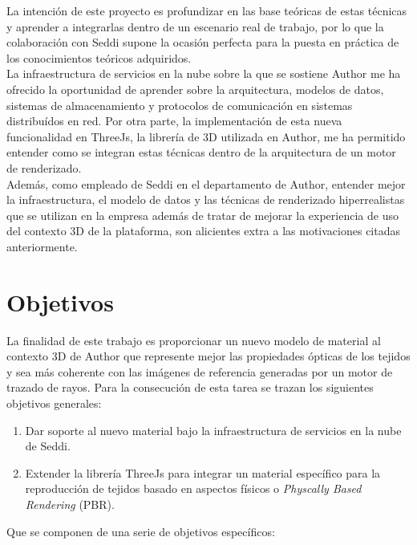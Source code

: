 La intenci\'on de este proyecto es profundizar en las base te\'oricas de estas t\'ecnicas y aprender a integrarlas
dentro de un escenario real de trabajo, por lo que la colaboraci\'on con Seddi supone la ocasi\'on perfecta para la puesta en pr\'actica
de los conocimientos te\'oricos adquiridos.\\

La infraestructura de servicios en la nube sobre la que se sostiene Author me ha ofrecido la oportunidad de
aprender sobre la arquitectura, modelos de datos, sistemas de almacenamiento y protocolos de comunicaci\'on en sistemas distribu\'idos
en red. Por otra parte, la implementaci\'on de esta nueva funcionalidad en ThreeJs, la librer\'ia de 3D utilizada en Author,
me ha permitido entender como se integran estas t\'ecnicas dentro de la arquitectura de un motor de renderizado.\\

Adem\'as, como empleado de Seddi en el departamento de Author, entender mejor la infraestructura, el modelo de datos y las t\'ecnicas
de renderizado hiperrealistas que se utilizan en la empresa adem\'as de tratar de mejorar la experiencia de uso del contexto 3D de
la plataforma, son alicientes extra a las motivaciones citadas anteriormente.

\section{Objetivos}

La finalidad de este trabajo es proporcionar un nuevo modelo de material al contexto 3D de Author que represente mejor las propiedades
\'opticas de los tejidos y sea m\'as coherente con las im\'agenes de referencia generadas por un motor de trazado de rayos. Para la
consecuci\'on de esta tarea se trazan los siguientes objetivos generales:

\begin{enumerate}[label=(\roman*)]
	\item Dar soporte al nuevo material bajo la infraestructura de servicios en la nube de Seddi.
  \item Extender la librer\'ia ThreeJs para integrar un material espec\'ifico para la reproducci\'on de tejidos basado
  en aspectos f\'isicos o \textit{Physcally Based Rendering} (PBR).
\end{enumerate}

Que se componen de una serie de objetivos espec\'ificos:


